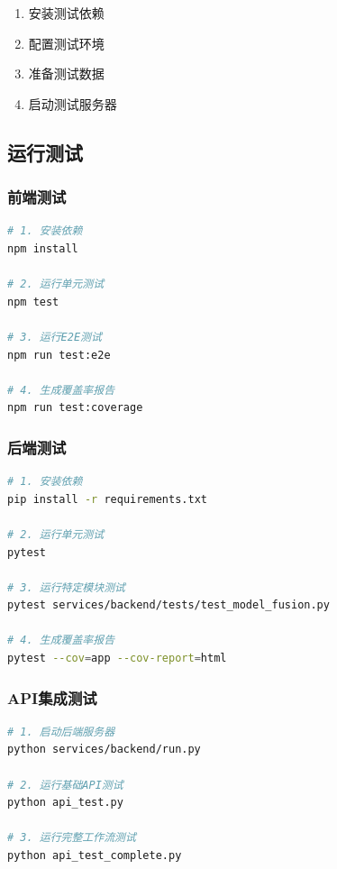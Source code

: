 \documentclass[12pt,a4paper,openany]{report}
\begin{document}
\begin{enumerate}
    \item 安装测试依赖
    \item 配置测试环境
    \item 准备测试数据
    \item 启动测试服务器
\end{enumerate}

\subsection{运行测试}

\subsubsection{前端测试}

\begin{lstlisting}[language=bash, caption=运行前端测试]
# 1. 安装依赖
npm install

# 2. 运行单元测试
npm test

# 3. 运行E2E测试
npm run test:e2e

# 4. 生成覆盖率报告
npm run test:coverage
\end{lstlisting}

\subsubsection{后端测试}

\begin{lstlisting}[language=bash, caption=运行后端测试]
# 1. 安装依赖
pip install -r requirements.txt

# 2. 运行单元测试
pytest

# 3. 运行特定模块测试
pytest services/backend/tests/test_model_fusion.py

# 4. 生成覆盖率报告
pytest --cov=app --cov-report=html
\end{lstlisting}

\subsubsection{API集成测试}

\begin{lstlisting}[language=bash, caption=运行API集成测试]
# 1. 启动后端服务器
python services/backend/run.py

# 2. 运行基础API测试
python api_test.py

# 3. 运行完整工作流测试
python api_test_complete.py
\end{lstlisting}
\end{document}
